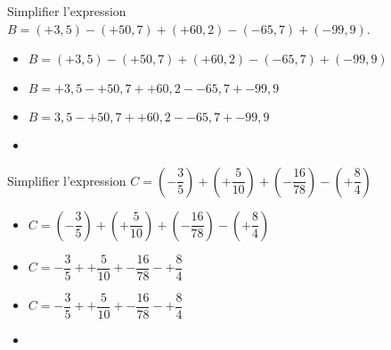 \begin{exemple*1}
  Simplifier l'expression $B=(+3,5)-(+50,7)+(+60,2)-(-65,7)+(-99,9)$.
  \correction
  \begin{itemize}
    \item[] $B=(+3,5)-(+50,7)+(+60,2)-(-65,7)+(-99,9)$
    \item[] $B=+3,5-+50,7++60,2--65,7+-99,9$ 
    \item[] $B=3,5-+50,7++60,2--65,7+-99,9$
    \item[] 
  \end{itemize}
\end{exemple*1}

\begin{exemple*1}
  Simplifier l'expression $C=(-\dfrac35)+(+\dfrac5{10})+(-\dfrac{16}{78})-(+\dfrac84)$
  \correction
  \medskip
  \begin{itemize}
    \item[] $C=(-\dfrac35)+(+\dfrac5{10})+(-\dfrac{16}{78})-(+\dfrac84)$
    \item[] $C=-\dfrac35++\dfrac5{10}+-\dfrac{16}{78}-+\dfrac84$
    \item[] $C=-\dfrac35++\dfrac5{10}+-\dfrac{16}{78}-+\dfrac84$
    \item[] 
  \end{itemize}
\end{exemple*1}